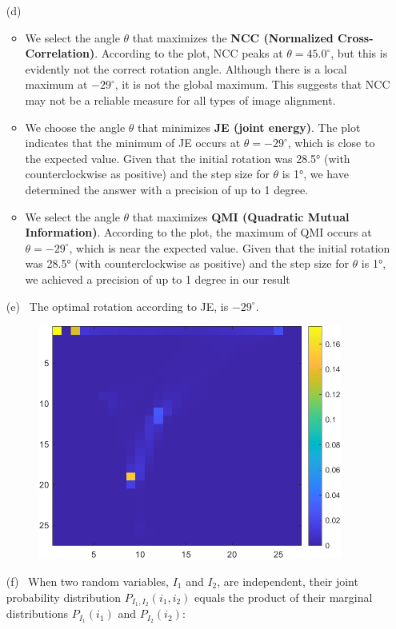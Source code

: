 \documentclass[11pt]{article}
\begin{document}
\begin{enumerate}
\begin{enumerate}
\pagebreak
\item [(d)] \
\begin{itemize}
  \item We select the angle $\theta$ that maximizes the \textbf{NCC (Normalized Cross-Correlation)}. According to the plot, NCC peaks at $\theta = 45.0^\circ$, but this is evidently not the correct rotation angle. Although there is a local maximum at $-29^\circ$, it is not the global maximum. This suggests that NCC may not be a reliable measure for all types of image alignment.
  \item We choose the angle $\theta$ that minimizes \textbf{JE (joint energy)}. The plot indicates that the minimum of JE occurs at $\theta = -29^\circ$, which is close to the expected value. Given that the initial rotation was 28.5° (with counterclockwise as positive) and the step size for $\theta$ is 1°, we have determined the answer with a precision of up to 1 degree.
  \item  We select the angle $\theta$ that maximizes \textbf{QMI (Quadratic Mutual Information)}. According to the plot, the maximum of QMI occurs at $\theta = -29^\circ$, which is near the expected value. Given that the initial rotation was 28.5° (with counterclockwise as positive) and the step size for $\theta$ is 1°, we achieved a precision of up to 1 degree in our result
\end{itemize}

\item [(e)] \
The optimal rotation according to JE, is $-29^\circ$.
\begin{figure}[!htb]
\centering
\includegraphics[width=100mm]{images/op_JE_hist.png}
\end{figure}
\item [(f)] \
When two random variables, \( I_1 \) and \( I_2 \), are independent, their joint probability distribution \( P_{I_1, I_2}(i_1, i_2) \) equals the product of their marginal distributions \( P_{I_1}(i_1) \) and \( P_{I_2}(i_2) \):


\end{enumerate}
\end{enumerate}
\end{document}
